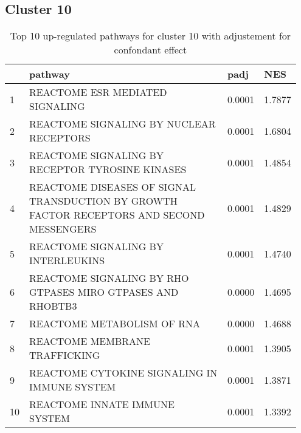 \documentclass{article}
\begin{document}
\subsection{Cluster 10 }
\begin{table}[H]
\centering
\begin{tabular}{p{0.05\linewidth}p{0.7\linewidth}p{0.1\linewidth}p{0.1\linewidth}}
  \hline
 & pathway & padj & NES \\ 
  \hline
1 & REACTOME ESR MEDIATED SIGNALING & 0.0001 & 1.7877 \\ 
  2 & REACTOME SIGNALING BY NUCLEAR RECEPTORS & 0.0001 & 1.6804 \\ 
  3 & REACTOME SIGNALING BY RECEPTOR TYROSINE KINASES & 0.0001 & 1.4854 \\ 
  4 & REACTOME DISEASES OF SIGNAL TRANSDUCTION BY GROWTH FACTOR RECEPTORS AND SECOND MESSENGERS & 0.0001 & 1.4829 \\ 
  5 & REACTOME SIGNALING BY INTERLEUKINS & 0.0001 & 1.4740 \\ 
  6 & REACTOME SIGNALING BY RHO GTPASES MIRO GTPASES AND RHOBTB3 & 0.0000 & 1.4695 \\ 
  7 & REACTOME METABOLISM OF RNA & 0.0000 & 1.4688 \\ 
  8 & REACTOME MEMBRANE TRAFFICKING & 0.0001 & 1.3905 \\ 
  9 & REACTOME CYTOKINE SIGNALING IN IMMUNE SYSTEM & 0.0001 & 1.3871 \\ 
  10 & REACTOME INNATE IMMUNE SYSTEM & 0.0001 & 1.3392 \\ 
   \hline
\end{tabular}
\caption{Top 10 up-regulated pathways for cluster 10 with adjustement for confondant effect} 
\label{tab:q3_2_conf_10}
\end{table}
\end{document}
